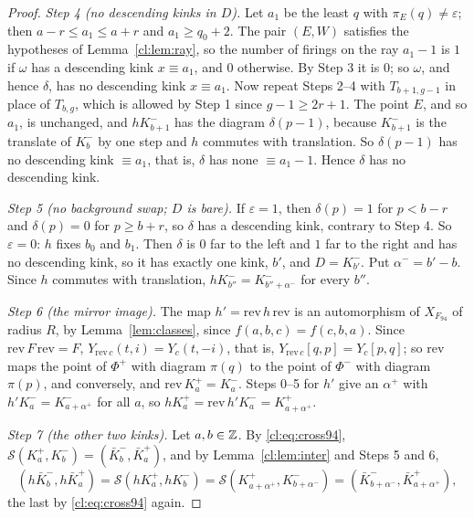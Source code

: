 \begin{proof}
\emph{Step 4 (no descending kinks in $D$).} Let $a_1$ be the least $q$ with $\pi_E(q)\ne\varepsilon$; then $a-r\le a_1\le a+r$ and $a_1\ge q_0+2$. The pair $(E,W)$ satisfies the hypotheses of Lemma~\ref{cl:lem:ray}, so the number of firings on the ray $a_1-1$ is $1$ if $\omega$ has a descending kink $x\equiv a_1$, and $0$ otherwise. By Step 3 it is $0$; so $\omega$, and hence $\delta$, has no descending kink $x\equiv a_1$. Now repeat Steps 2--4 with $T_{b+1,g-1}$ in place of $T_{b,g}$, which is allowed by Step 1 since $g-1\ge2r+1$. The point $E$, and so $a_1$, is unchanged, and $hK^-_{b+1}$ has the diagram $\delta(p-1)$, because $K^-_{b+1}$ is the translate of $K^-_b$ by one step and $h$ commutes with translation. So $\delta(p-1)$ has no descending kink $\equiv a_1$, that is, $\delta$ has none $\equiv a_1-1$. Hence $\delta$ has no descending kink.

\emph{Step 5 (no background swap; $D$ is bare).} If $\varepsilon=1$, then $\delta(p)=1$ for $p<b-r$ and $\delta(p)=0$ for $p\ge b+r$, so $\delta$ has a descending kink, contrary to Step 4. So $\varepsilon=0$: $h$ fixes $b_0$ and $b_1$. Then $\delta$ is $0$ far to the left and $1$ far to the right and has no descending kink, so it has exactly one kink, $b'$, and $D=K^-_{b'}$. Put $\alpha^-=b'-b$. Since $h$ commutes with translation, $hK^-_{b''}=K^-_{b''+\alpha^-}$ for every $b''$.

\emph{Step 6 (the mirror image).} The map $h'=\mathrm{rev}\,h\,\mathrm{rev}$ is an automorphism of $X_{F_{94}}$ of radius $R$, by Lemma~\ref{lem:classes}, since $f(a,b,c)=f(c,b,a)$. Since $\mathrm{rev}\,F\,\mathrm{rev}=F$, $Y_{\mathrm{rev}\,c}(t,i)=Y_c(t,-i)$, that is, $Y_{\mathrm{rev}\,c}[q,p]=Y_c[p,q]$; so $\mathrm{rev}$ maps the point of $\Phi^+$ with diagram $\pi(q)$ to the point of $\Phi^-$ with diagram $\pi(p)$, and conversely, and $\mathrm{rev}\,K^+_a=K^-_a$. Steps 0--5 for $h'$ give an $\alpha^+$ with $h'K^-_a=K^-_{a+\alpha^+}$ for all $a$, so $hK^+_a=\mathrm{rev}\,h'K^-_a=K^+_{a+\alpha^+}$.

\emph{Step 7 (the other two kinks).} Let $a,b\in\mathbb{Z}$. By \eqref{cl:eq:cross94}, $\mathcal S(K^+_a,K^-_b)=(\bar K^-_b,\bar K^+_a)$, and by Lemma~\ref{cl:lem:inter} and Steps 5 and 6,
\[
(h\bar K^-_b,h\bar K^+_a)=\mathcal S(hK^+_a,hK^-_b)=\mathcal S(K^+_{a+\alpha^+},K^-_{b+\alpha^-})=(\bar K^-_{b+\alpha^-},\bar K^+_{a+\alpha^+}),
\]
the last by \eqref{cl:eq:cross94} again.


\end{proof}
